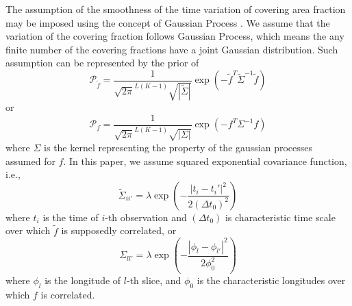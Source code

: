\documentclass[iop,numberedappendix,apj,]{emulateapj}
\def\fast{\tilde f}
\begin{document}
The assumption of the smoothness of the time variation of covering area fraction may be imposed using the concept of Gaussian Process \citep{Rasmussen2005}. 
We assume that the variation of the covering fraction follows Gaussian Process, which means the any finite number of the covering fractions have a joint Gaussian distribution. 
Such assumption can be represented by the prior of 
\begin{equation}
\mathcal{P}_{\fast} = \frac{1}{\sqrt{ 2 \pi }^{L(K-1)} \sqrt{| \tilde \Sigma |} } \exp( - \fast^{T} \tilde \Sigma ^{-1} \fast ) 
\end{equation}
or
\begin{equation}
\mathcal{P}_f = \frac{1}{\sqrt{ 2 \pi }^{L(K-1)} \sqrt{| \Sigma  |}} \exp( - f^{T} \Sigma ^{-1} f ) 
\end{equation}
where $\Sigma $ is the kernel representing the property of the gaussian processes assumed for $f$.
In this paper, we assume squared exponential covariance function, i.e., 
\begin{equation}
\tilde \Sigma _{ii'} = \lambda \exp \left( - \frac{|t_i- t_i'|^2}{2 (\Delta t_0) ^2} \right)
\end{equation}
where $t_i$ is the time of $i$-th observation and $(\Delta t_0)$ is characteristic time scale over which $\fast $ is supposedly correlated, or 
\begin{equation}
\Sigma _{ll'} = \lambda \exp \left( - \frac{|\phi_l- \phi_{l'}|^2}{2 \phi_0^2} \right)
\end{equation}
where $\phi_l$ is the longitude of $l$-th slice, and $\phi_0$ is the characteristic longitudes over which $f$ is correlated.  





\end{document}
